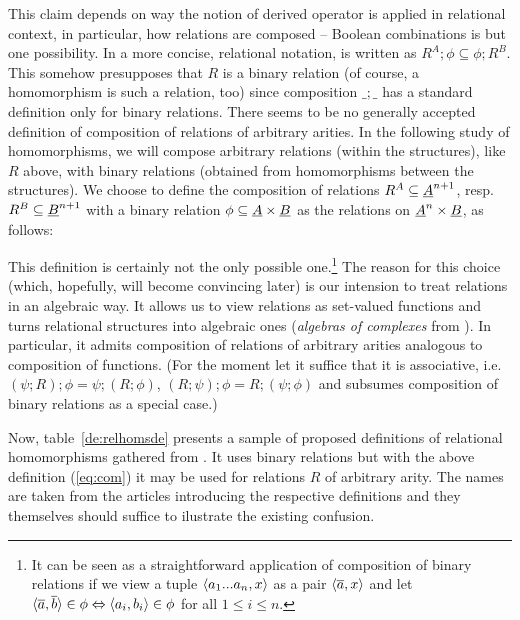 \documentclass[10pt]{article}
\begin{document}
This claim depends on way the notion of derived operator is applied in
relational context, in particular, how relations are composed --
Boolean combinations is but one possibility.
In a more concise, relational notation,  is written as
$R^A;\phi\subseteq \phi;R^B$. This somehow presupposes that $R$ is a
binary relation (of course, a homomorphism is such a relation,
too) since composition $\_;\_$ has a standard definition only for
binary relations.  There seems to be no generally accepted definition
of composition of relations of arbitrary arities. In the following
study of homomorphisms, we will compose arbitrary relations (within
the structures), like $R$ above, with binary relations (obtained from
homomorphisms between the structures).  We choose to define the
composition of relations $R^A\subseteq \underline {A}^{n+1}$, resp.
$R^B\subseteq \underline {B}^{n+1}$ with a binary relation $\phi\subseteq
\underline {A}\times\underline {B}$ as the relations on $\underline {A}^n\times\underline {B}$, as follows:

%
This definition is certainly not the only possible one.\footnote{It
can be seen as a straightforward application of composition of binary
relations if we view a tuple $\langle a_1...a_n,x\rangle$ as a pair $\langle\overline {a},x\rangle$ and let $\langle\overline {a},\overline {b}\rangle\in\phi \Leftrightarrow \langle a_i,b_i\rangle\in\phi$ for
all $1\leq i\leq n$.}  The reason for this choice (which, hopefully,
will become convincing later) is our intension to treat relations in
an algebraic way. 
It allows us to view relations as set-valued functions and turns
relational structures into algebraic ones
({\em algebras of complexes} from \cite{JT1,JT2}). In particular, it admits
composition of relations of arbitrary
arities analogous to composition of functions. (For the moment let
it suffice that it is associative, i.e.\
$(\psi;R);\phi=\psi;(R;\phi)$, $(R;\psi);\phi=R;(\psi;\phi)$ and
subsumes composition of binary relations as a special case.)

Now, table~\ref{de:relhomsde} presents
a sample of proposed definitions of relational homomorphisms gathered from 
\cite{Most,Gratzer,Cohn,Los:relhoms,Pattison,relhoms,c:93,c:94}. It uses binary
relations but with the above definition (\ref{eq:com}) it may be used for relations
$R$ of arbitrary arity.
The names are taken from the articles introducing the respective
definitions and they themselves should suffice to ilustrate the
existing confusion.  
\end{document}

